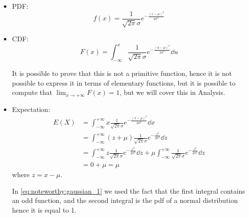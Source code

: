 \documentclass[14pt]{extarticle}
\begin{document}
\begin{itemize}
    \item PDF:
          \begin{equation}
              f(x) = \frac{1}{\sqrt{2\pi} \sigma} e^{-\frac{(x-\mu)^2}{2\sigma^2}}
          \end{equation}
    \item CDF:
          \begin{equation}
              F(x) = \int_{-\infty}^x \frac{1}{\sqrt{2\pi} \sigma} e^{-\frac{(u-\mu)^2}{2\sigma^2}} \dd{u}
          \end{equation}

          It is possible to prove that this is not a primitive function, hence it is not possible to express it in terms of elementary functions, but it is possible to compute that $\lim_{x \to +\infty} F(x) = 1$, but we will cover this in Analysis.
    \item Expectation:
          \begin{align}
              E(X) & = \int_{-\infty}^{+\infty} x \frac{1}{\sqrt{2\pi} \sigma} e^{-\frac{(x-\mu)^2}{2\sigma^2}} \dd{x}                                                                                         \\
                   & = \int_{-\infty}^{+\infty} (z + \mu) \frac{1}{\sqrt{2\pi} \sigma} e^{-\frac{z^2}{2\sigma^2}} \dd{z}                                                                                       \\
                   & = \int_{-\infty}^{+\infty} z \frac{1}{\sqrt{2\pi} \sigma} e^{-\frac{z^2}{2\sigma^2}} \dd{z} + \mu \int_{-\infty}^{+\infty} \frac{1}{\sqrt{2\pi} \sigma} e^{-\frac{z^2}{2\sigma^2}} \dd{z} \\
                   & = 0 + \mu = \mu \label{eq:noteworthy:gaussian_1}
          \end{align}
          where $z = x - \mu$.

          In \autoref{eq:noteworthy:gaussian_1} we used the fact that the first integral contains an odd function, and the second integral is the pdf of a normal distribution hence it is equal to 1.


\end{itemize}
\end{document}
